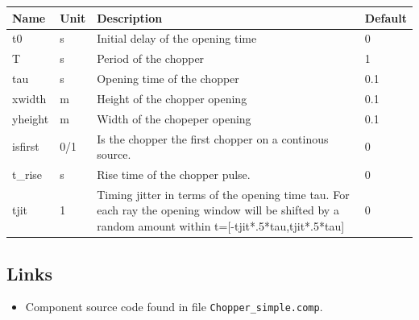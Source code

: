 \begin{longtable}{p{}p{}p{}p{}}
\toprule
\textbf{Name} & \textbf{Unit} & \textbf{Description} & \textbf{Default} \\
\midrule
\endhead
t0 & s & Initial delay of the opening time & 0 \\
T & s & Period of the chopper & 1 \\
tau & s & Opening time of the chopper & 0.1 \\
xwidth & m & Height of the chopper opening & 0.1 \\
yheight & m & Width of the chopeper opening & 0.1 \\
isfirst & 0/1 & Is the chopper the first chopper on a continous source. & 0 \\
t\_rise & s & Rise time of the chopper pulse. & 0 \\
tjit & 1 & Timing jitter in terms of the opening time tau. For each ray the opening window will be shifted by a random amount within t=[-tjit*.5*tau,tjit*.5*tau] & 0 \\
\bottomrule
\end{longtable}

\subsection*{Links}
\begin{itemize}
  \item Component source code found in file \texttt{Chopper\_simple.comp}.
\end{itemize}
